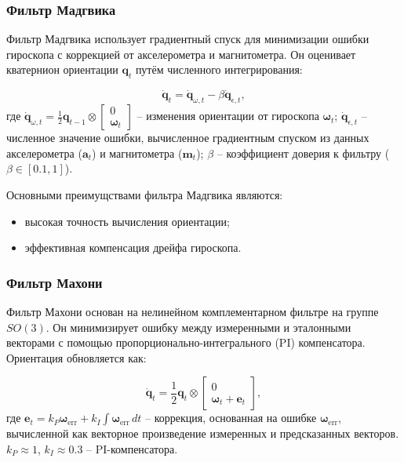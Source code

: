 \subsubsection{Фильтр Мадгвика}
\hfill

Фильтр Мадгвика использует градиентный спуск для минимизации ошибки гироскопа 
с коррекцией от акселерометра и магнитометра. Он оценивает кватернион ориентации
\(\mathbf{q}_t\) путём численного интегрирования:

\begin{equation}
    \dot{\mathbf{q}}_t = \dot{\mathbf{q}}_{\omega, t} - \beta \dot{\mathbf{q}}_{\epsilon, t},
\end{equation}
где
    \(\dot{\mathbf{q}}_{\omega, t} = \frac{1}{2} \mathbf{q}_{t-1} \otimes \begin{bmatrix} 0 \\ 
    \boldsymbol{\omega}_t \end{bmatrix}\) -- изменения ориентации от гироскопа \(\boldsymbol{\omega}_t\);
    \(\dot{\mathbf{q}}_{\epsilon, t}\) -- 
    численное значение ошибки, вычисленное градиентным спуском из данных акселерометра 
    (\(\mathbf{a}_t\)) и магнитометра (\(\mathbf{m}_t\));
    \(\beta\) -- коэффициент доверия к фильтру ($\beta \in [0.1, 1]$).

Основными преимущствами фильтра Мадгвика являются:
\begin{itemize}
	\item высокая точность вычисления ориентации;
	\item эффективная компенсация дрейфа гироскопа.
\end{itemize}

\subsubsection{Фильтр Махони}
\hfill

Фильтр Махони основан на нелинейном комплементарном фильтре на группе \(SO(3)\).
Он минимизирует ошибку между измеренными и эталонными векторами с помощью пропорционально-интегрального (PI)
компенсатора. Ориентация обновляется как:

\begin{equation}
    \dot{\mathbf{q}}_t = \frac{1}{2} \mathbf{q}_t \otimes \begin{bmatrix} 0 \\ \boldsymbol{\omega}_t + \mathbf{e}_t \end{bmatrix},
\end{equation}
где
    \(\mathbf{e}_t = k_P \boldsymbol{\omega}_{\text{err}} + k_I \int \boldsymbol{\omega}_{\text{err}} \, dt\) --
    коррекция, основанная на ошибке \(\boldsymbol{\omega}_{\text{err}}\), 
    вычисленной как векторное произведение измеренных и предсказанных векторов.
    \(k_P \approx 1\), \(k_I \approx 0.3\) -- PI-компенсатора.

